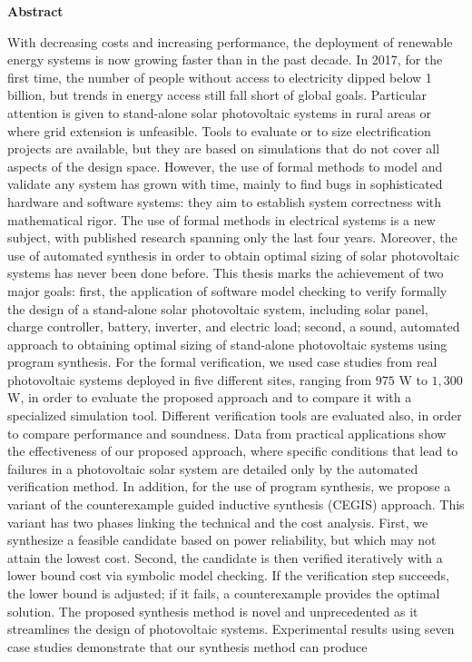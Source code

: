\thispagestyle{plain}
\begin{center}
%    
%    
%    
    \vspace{0.9cm}
    \textbf{Abstract}
\end{center}
With decreasing costs and increasing performance, the deployment of renewable energy systems is now growing faster than in the past decade. In 2017, for the first time, the number of people without access to electricity dipped below 1 billion, but trends in energy access still fall short of global goals. Particular attention is given to stand-alone solar photovoltaic systems in rural areas or where grid extension is unfeasible. Tools to evaluate or to size electrification projects are available, but they are based on simulations that do not cover all aspects of the design space. However, the use of formal methods to model and validate any system has grown with time, mainly to find bugs in sophisticated hardware and software systems: they aim to establish system correctness with mathematical rigor. The use of formal methods in electrical systems is a new subject, with published research spanning only the last four years. Moreover, the use of automated synthesis in order to obtain optimal sizing of solar photovoltaic systems has never been done before. This thesis marks the achievement of two major goals: first, the application of software model checking to verify formally the design of a stand-alone solar photovoltaic system, including solar panel, charge controller, battery, inverter, and electric load; second, a sound, automated approach to obtaining optimal sizing of stand-alone photovoltaic systems using program synthesis. For the formal verification, we used case studies from real photovoltaic systems deployed in five different sites, ranging from $975$ W to $1,300$ W, in order to evaluate the proposed approach and to compare  it with a specialized simulation tool. Different verification tools are evaluated also, in order to compare performance and soundness. Data from practical applications show the effectiveness of our proposed approach, where specific conditions that lead to failures in a photovoltaic solar system are detailed only by the automated verification method. In addition, for the use of program synthesis, we propose a variant of the counterexample guided inductive synthesis (CEGIS) approach. This variant has two phases linking the technical and the cost analysis. First, we synthesize a feasible candidate based on power reliability, but which may not attain the lowest cost. Second, the candidate is then verified iteratively with a lower bound cost via symbolic model checking. If the verification step succeeds, the lower bound is adjusted; if it fails, a counterexample provides the optimal solution. The proposed synthesis method is novel and unprecedented as it streamlines the design of photovoltaic systems. Experimental results using seven case studies demonstrate that our synthesis method can produce 